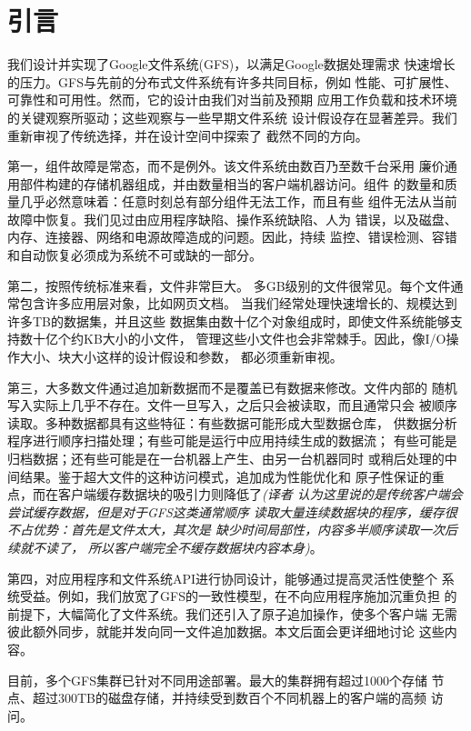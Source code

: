 \section{引言}

我们设计并实现了Google文件系统(GFS)，以满足Google数据处理需求
快速增长的压力。GFS与先前的分布式文件系统有许多共同目标，例如
性能、可扩展性、可靠性和可用性。然而，它的设计由我们对当前及预期
应用工作负载和技术环境的关键观察所驱动；这些观察与一些早期文件系统
设计假设存在显著差异。我们重新审视了传统选择，并在设计空间中探索了
截然不同的方向。

第一，组件故障是常态，而不是例外。该文件系统由数百乃至数千台采用
廉价通用部件构建的存储机器组成，并由数量相当的客户端机器访问。组件
的数量和质量几乎必然意味着：任意时刻总有部分组件无法工作，而且有些
组件无法从当前故障中恢复。我们见过由应用程序缺陷、操作系统缺陷、人为
错误，以及磁盘、内存、连接器、网络和电源故障造成的问题。因此，持续
监控、错误检测、容错和自动恢复必须成为系统不可或缺的一部分。

第二，按照传统标准来看，文件非常巨大。
多GB级别的文件很常见。每个文件通常包含许多应用层对象，比如网页文档。
当我们经常处理快速增长的、规模达到许多TB的数据集，并且这些
数据集由数十亿个对象组成时，即使文件系统能够支持数十亿个约KB大小的小文件，
管理这些小文件也会非常棘手。因此，像I/O操作大小、块大小这样的设计假设和参数，
都必须重新审视。

第三，大多数文件通过追加新数据而不是覆盖已有数据来修改。文件内部的
随机写入实际上几乎不存在。文件一旦写入，之后只会被读取，而且通常只会
被顺序读取。多种数据都具有这些特征：有些数据可能形成大型数据仓库，
供数据分析程序进行顺序扫描处理；有些可能是运行中应用持续生成的数据流；
有些可能是归档数据；还有些可能是在一台机器上产生、由另一台机器同时
或稍后处理的中间结果。鉴于超大文件的这种访问模式，追加成为性能优化和
原子性保证的重点，而在客户端缓存数据块的吸引力则降低了\emph{(译者
认为这里说的是传统客户端会尝试缓存数据，但是对于GFS这类通常顺序
读取大量连续数据块的程序，缓存很不占优势：首先是文件太大，其次是
缺少时间局部性，内容多半顺序读取一次后续就不读了，
所以客户端完全不缓存数据块内容本身)}。

第四，对应用程序和文件系统API进行协同设计，能够通过提高灵活性使整个
系统受益。例如，我们放宽了GFS的一致性模型，在不向应用程序施加沉重负担
的前提下，大幅简化了文件系统。我们还引入了原子追加操作，使多个客户端
无需彼此额外同步，就能并发向同一文件追加数据。本文后面会更详细地讨论
这些内容。

目前，多个GFS集群已针对不同用途部署。最大的集群拥有超过1000个存储
节点、超过300TB的磁盘存储，并持续受到数百个不同机器上的客户端的高频
访问。